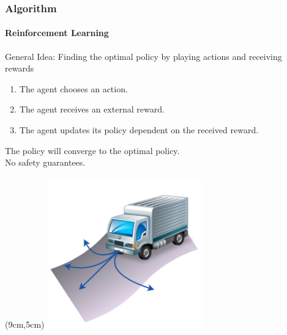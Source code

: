\documentclass[t]{beamer}
\begin{document}
\begin{frame}
\frametitle{Algorithm}
\framesubtitle{Reinforcement Learning}
General Idea: Finding the optimal policy by playing actions and receiving rewards
\begin{enumerate}
\item The agent chooses an action.
\item The agent receives an external reward.
\item The agent updates its policy dependent on the received reward.
\end{enumerate}
\vspace{0.5cm}
 The policy will converge to the optimal policy.\\
 No safety guarantees.
\begin{textblock*}{7cm}(9cm,5cm) %
\includegraphics[trim=0mm 0mm 0mm 0mm, width=0.5\textwidth]{PossibleTrajectories}
\end{textblock*}
\end{frame}
\end{document}
